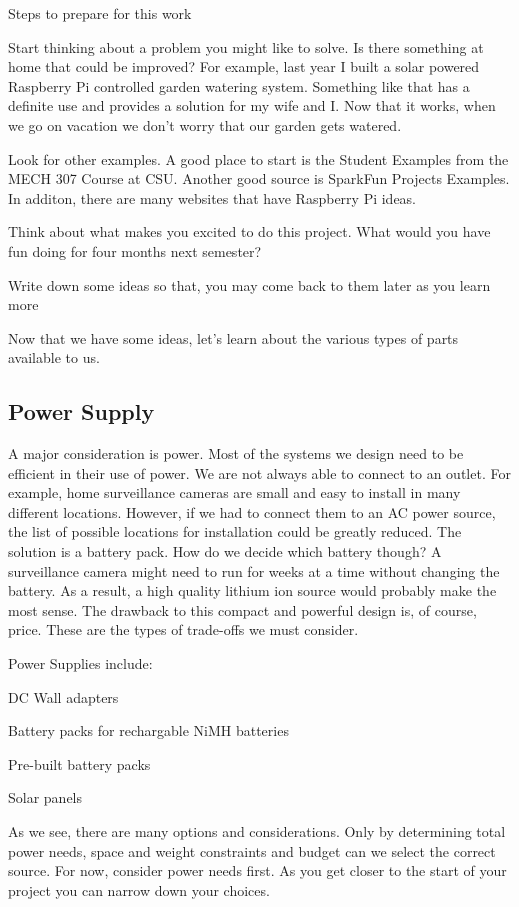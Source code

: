 \documentclass[
]{book}
\begin{document}
Steps to prepare for this work

Start thinking about a problem you might like to solve. Is there something at home that could be improved? For example, last year I built a solar powered Raspberry Pi controlled garden watering system. Something like that has a definite use and provides a solution for my wife and I. Now that it works, when we go on vacation we don't worry that our garden gets watered.

Look for other examples. A good place to start is the Student Examples from the MECH 307 Course at CSU. Another good source is SparkFun Projects Examples. In additon, there are many websites that have Raspberry Pi ideas.

Think about what makes you excited to do this project. What would you have fun doing for four months next semester?

Write down some ideas so that, you may come back to them later as you learn more

Now that we have some ideas, let's learn about the various types of parts available to us.

\hypertarget{power-supply}{%
\subsection{Power Supply}\label{power-supply}}

A major consideration is power. Most of the systems we design need to be efficient in their use of power. We are not always able to connect to an outlet. For example, home surveillance cameras are small and easy to install in many different locations. However, if we had to connect them to an AC power source, the list of possible locations for installation could be greatly reduced. The solution is a battery pack. How do we decide which battery though? A surveillance camera might need to run for weeks at a time without changing the battery. As a result, a high quality lithium ion source would probably make the most sense. The drawback to this compact and powerful design is, of course, price. These are the types of trade-offs we must consider.

Power Supplies include:

DC Wall adapters

Battery packs for rechargable NiMH batteries

Pre-built battery packs

Solar panels

As we see, there are many options and considerations. Only by determining total power needs, space and weight constraints and budget can we select the correct source. For now, consider power needs first. As you get closer to the start of your project you can narrow down your choices.
\end{document}
